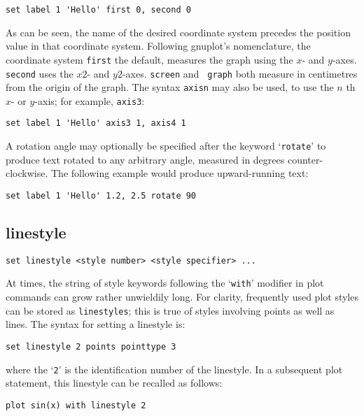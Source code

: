 \documentclass[a4paper,onecolumn,11pt]{book}
\begin{document}
\begin{verbatim}
set label 1 'Hello' first 0, second 0
\end{verbatim}

As can be seen, the name of the desired coordinate system precedes the position
value in that coordinate system. Following gnuplot's nomenclature, the
coordinate system {\tt first} the default, measures the graph using the $x$- and
$y$-axes. {\tt second} uses the $x2$- and $y2$-axes.  {\tt screen} and {\tt
graph} both measure in centimetres from the origin of the graph.  The syntax
{\tt axisn} may also be used, to use the $n$ th $x$- or $y$-axis; for example,
{\tt axis3}:

\begin{verbatim}
set label 1 'Hello' axis3 1, axis4 1
\end{verbatim}

A rotation angle may optionally be specified after the keyword `{\tt rotate}'
to produce text rotated to any arbitrary angle, measured in degrees
counter-clockwise. The following example would produce upward-running text:

\begin{verbatim}
set label 1 'Hello' 1.2, 2.5 rotate 90
\end{verbatim}


\subsection{linestyle}

\begin{verbatim}
set linestyle <style number> <style specifier> ...
\end{verbatim}

At times, the string of style keywords following the `{\tt with}' modifier in plot
commands can grow rather unwieldily long. For clarity, frequently used plot
styles can be stored as {\tt linestyles}; this is true of styles involving
points as well as lines. The syntax for setting a linestyle is:

\begin{verbatim}
set linestyle 2 points pointtype 3
\end{verbatim}

\noindent where the `{\tt 2}' is the identification number of the linestyle. In a subsequent
plot statement, this linestyle can be recalled as follows:

\begin{verbatim}
plot sin(x) with linestyle 2
\end{verbatim}
\end{document}

